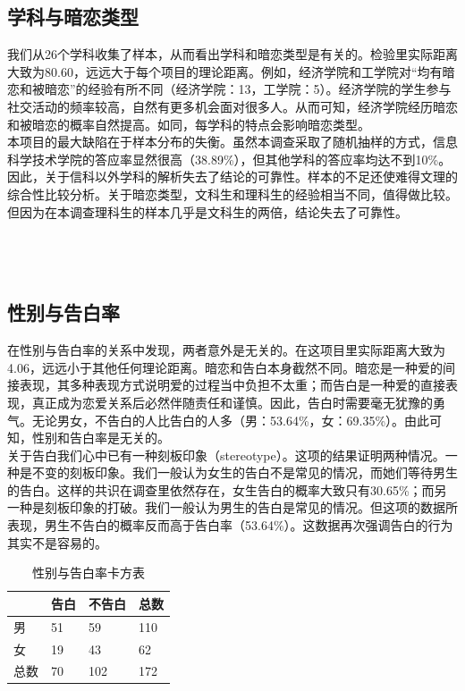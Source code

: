 \documentclass[10pt, a4paper, twocolumn]{ctexart}
\begin{document}
\subsection{学科与暗恋类型}
我们从26个学科收集了样本，从而看出学科和暗恋类型是有关的。检验里实际距离大致为80.60，远远大于每个项目的理论距离。例如，经济学院和工学院对“均有暗恋和被暗恋”的经验有所不同（经济学院：13，工学院：5）。经济学院的学生参与社交活动的频率较高，自然有更多机会面对很多人。从而可知，经济学院经历暗恋和被暗恋的概率自然提高。如同，每学科的特点会影响暗恋类型。\\
\indent 本项目的最大缺陷在于样本分布的失衡。虽然本调查采取了随机抽样的方式，信息科学技术学院的答应率显然很高（38.89\%），但其他学科的答应率均达不到10\%。因此，关于信科以外学科的解析失去了结论的可靠性。样本的不足还使难得文理的综合性比较分析。关于暗恋类型，文科生和理科生的经验相当不同，值得做比较。但因为在本调查理科生的样本几乎是文科生的两倍，结论失去了可靠性。\\\\\\\\
\subsection{性别与告白率}
在性别与告白率的关系中发现，两者意外是无关的。在这项目里实际距离大致为4.06，远远小于其他任何理论距离。暗恋和告白本身截然不同。暗恋是一种爱的间接表现，其多种表现方式说明爱的过程当中负担不太重；而告白是一种爱的直接表现，真正成为恋爱关系后必然伴随责任和谨慎。因此，告白时需要毫无犹豫的勇气。无论男女，不告白的人比告白的人多（男：53.64\%，女：69.35\%）。由此可知，性别和告白率是无关的。\\
\indent 关于告白我们心中已有一种刻板印象（stereotype）。这项的结果证明两种情况。一种是不变的刻板印象。我们一般认为女生的告白不是常见的情况，而她们等待男生的告白。这样的共识在调查里依然存在，女生告白的概率大致只有30.65\%；而另一种是刻板印象的打破。我们一般认为男生的告白是常见的情况。但这项的数据所表现，男生不告白的概率反而高于告白率（53.64\%）。这数据再次强调告白的行为其实不是容易的。\\
\begin{table}[htbp]
	\small
	\caption{性别与告白率卡方表}
	\centering
	\begin{tabular}{llll}
		 & 告白 & 不告白 & 总数 \\
		\midrule
		男&51&59&110 \\
		女&19&43&62 \\
		\midrule
		总数&70&102&172\\
		\bottomrule
	\end{tabular}
\end{table}
\\
\end{document}
